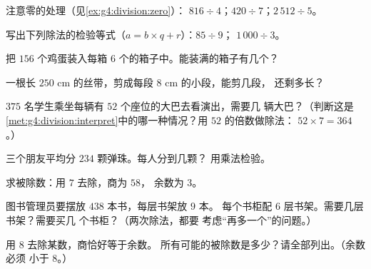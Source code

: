 \begin{exercise}[$\star$]\label{exo:g4:division:3}
注意零的处理（见\cref{ex:g4:division:zero}）：
$816 \div 4$；\quad $420 \div 7$；\quad $2\,512 \div 5$。
\end{exercise}

\begin{exercise}[$\star$]\label{exo:g4:division:4}
写出下列除法的检验等式（$a = b \times q + r$）：$85 \div 9$；
\quad $1\,000 \div 3$。
\end{exercise}

\begin{exercise}[$\star$]\label{exo:g4:division:5}
把 $156$ 个鸡蛋装入每箱 $6$ 个的箱子中。能装满的箱子有几个？
\end{exercise}

\begin{exercise}[$\star$]\label{exo:g4:division:6}
一根长 $250$ cm 的丝带，剪成每段 $8$ cm 的小段，能剪几段，
还剩多长？
\end{exercise}

\begin{exercise}[$\star$]\label{exo:g4:division:7}
$375$ 名学生乘坐每辆有 $52$ 个座位的大巴去看演出，需要几
辆大巴？（判断这是
\cref{met:g4:division:interpret}中的哪一种情况？用 $52$ 的倍数做除法：
$52 \times 7 = 364$。）
\end{exercise}

\begin{exercise}[$\star$]\label{exo:g4:division:8}
三个朋友平均分 $234$ 颗弹珠。每人分到几颗？
用乘法检验。
\end{exercise}

\begin{exercise}[$\star$]\label{exo:g4:division:9}
求被除数：用 $7$ 去除，商为 $58$，
余数为 $3$。
\end{exercise}

\begin{exercise}[$\star\star$]\label{exo:g4:division:10}
图书管理员要摆放 $438$ 本书，每层书架放 $9$ 本。
每个书柜配 $6$ 层书架。需要几层书架？需要买几
个书柜？（两次除法，都要
考虑“再多一个”的问题。）
\end{exercise}

\begin{exercise}[$\star\star$]\label{exo:g4:division:11}
用 $8$ 去除某数，商恰好等于余数。
所有可能的被除数是多少？请全部列出。（余数必须
小于 $8$。）
\end{exercise}
